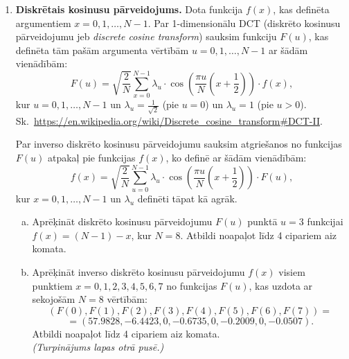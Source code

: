 \documentclass[11pt]{article}
\begin{document}
\begin{enumerate}
\item {\bf Diskrētais kosinusu pārveidojums.}
Dota funkcija $f(x)$, kas definēta argumentiem $x=0,1,\ldots,N-1$. 
Par 1-dimensionālu DCT (diskrēto kosinusu pārveidojumu jeb {\em discrete cosine transform}) sauksim 
funkciju $F(u)$, kas definēta tām pašām argumenta vērtībām $u=0,1,\ldots,N-1$ 
ar šādām vienādībām: 
$$F(u) = \sqrt{\frac{2}{N}} \sum\limits_{x=0}^{N-1} \lambda_u \cdot \cos \left( \frac{\pi u}{N}\left(  x+\frac{1}{2} \right) \right) \cdot f(x),$$
kur $u=0,1,\ldots,N-1$ un $\lambda_u = \frac{1}{\sqrt{2}}$ (pie $u=0$) un $\lambda_u = 1$ (pie $u>0$).\\
Sk.\ \url{https://en.wikipedia.org/wiki/Discrete_cosine_transform#DCT-II}.

Par inverso diskrēto kosinusu pārveidojumu sauksim atgriešanos no funkcijas $F(u)$ atpakaļ pie funkcijas $f(x)$, 
ko definē ar šādām vienādībām:
$$f(x) = \sqrt{\frac{2}{N}} \sum\limits_{u=0}^{N-1} \lambda_u \cdot \cos \left( \frac{\pi u}{N}\left(  x+\frac{1}{2} \right) \right) \cdot F(u),$$
kur $x=0,1,\ldots,N-1$ un $\lambda_u$ definēti tāpat kā agrāk.
\begin{enumerate}[(a)]
\item 
Aprēķināt diskrēto kosinusu pārveidojumu $F(u)$ punktā $u=3$
funkcijai\\ $f(x) = (N-1)-x$, kur $N=8$. 
Atbildi noapaļot līdz 4 cipariem aiz komata.
\item 
Aprēķināt inverso diskrēto kosinusu pārveidojumu $f(x)$ visiem 
punktiem $x=0,1,2,3,4,5,6,7$ no funkcijas $F(u)$, kas uzdota ar
sekojošām $N=8$ vērtībām:
$$(F(0),F(1),F(2),F(3),F(4),F(5),F(6),F(7)) =$$
$$ = (57.9828,-6.4423,0,-0.6735,0,-0.2009,0,-0.0507).$$
Atbildi noapaļot līdz 4 cipariem aiz komata.\\
{\em (Turpinājums lapas otrā pusē.)}
\end{enumerate}


\end{enumerate}
\end{document}

